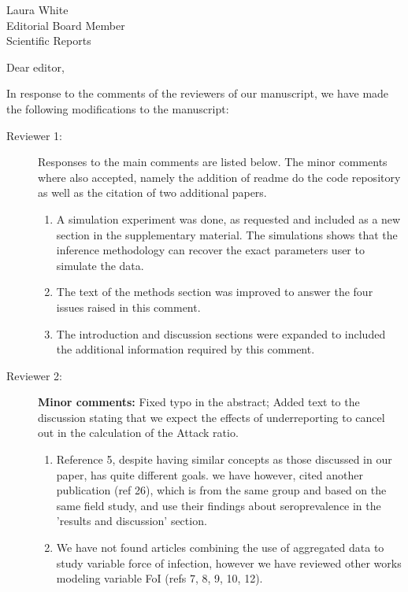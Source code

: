 \documentclass[a4paper,10pt]{letter}
\begin{document}

\begin{letter}{Laura White\\Editorial Board Member\\Scientific Reports }
\address{Escola de Matem\'atica Aplicada\\Funda\c{c}\~ao Getulio Vargas 
(FGV)\\Rio de Janeiro -- RJ\\Brazil.}

\opening{Dear editor,}

In response to the comments of the reviewers of our manuscript, we have made 
the following modifications to the manuscript:

\begin{description}
 \item[Reviewer 1:] Responses to the main comments are listed below. The minor 
comments where also accepted, namely the addition of readme do the code 
repository as well as the citation of two  additional papers. 
 
 \begin{enumerate}
  \item A simulation experiment was done, as requested and included as a new 
section in the supplementary material. The simulations shows that the inference 
methodology can recover the exact parameters user to simulate  the data.
\item The text of the methods section was improved to answer the four issues 
raised in this comment.
\item The introduction and discussion sections were expanded to included the 
additional information required by this comment.
 \end{enumerate}

 \item [Reviewer 2:] \textbf{Minor comments:} Fixed typo in the abstract; Added 
text to the discussion stating that we expect the effects of underreporting to 
cancel out in the calculation of the Attack ratio. 
 \begin{enumerate}
  \item Reference 5, despite having similar concepts as those discussed in our 
paper, has quite different goals. we have however, cited another publication 
(ref 26), which is from the same group and based on the same field study, and 
use their findings about seroprevalence in the 'results and discussion' section.
\item We have not found articles combining the use of aggregated data to study 
variable force of infection, however we have reviewed other works modeling 
variable FoI (refs 7, 8, 9, 10, 12).
 \end{enumerate}


\end{description}
\end{letter}
\end{document}
